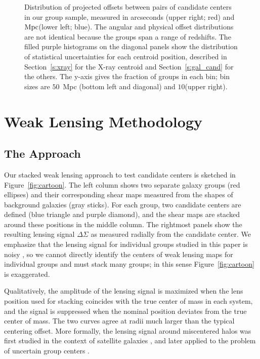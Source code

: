 \documentclass[12pt]{emulateapj}
\begin{document}
\begin{figure*}[htb]
\caption{Distribution of projected offsets between pairs of candidate
  centers in our group sample, measured in arcseconds (upper right;
  red) and ${\rm Mpc} $(lower left; blue). The angular and physical
  offset distributions are not identical because the groups span a
  range of redshifts. The filled purple histograms on the diagonal
  panels show the distribution of statistical uncertainties for each
  centroid position, described in Section~\ref{s:xray} for the X-ray
  centroid and Section~\ref{s:gal_cand} for the others. The y-axis
  gives the fraction of groups in each bin; 
  bin sizes are $50$~\rm{Mpc} (bottom left and diagonal) and
  $10$\arcsec (upper right).}
\label{fig:offsets}
\end{figure*}



\section{Weak Lensing Methodology}
\label{s:lensing}

\subsection{The Approach}

Our stacked weak lensing approach to test candidate centers is
sketched in Figure~\ref{fig:cartoon}. The left column shows two
separate galaxy groups (red ellipses) and their corresponding shear
maps measured from the shapes of background galaxies (gray
sticks). For each group, two candidate centers are defined (blue
triangle and purple diamond), and the shear maps are stacked around
these positions in the middle column. The rightmost panels show the
resulting lensing signal $\Delta\Sigma$ as measured radially from the
candidate center. We emphasize that the lensing signal for individual
groups studied in this paper is noisy \citep[signal-to-noise $\sim1$;
see Figure 1 of ][]{Leauthaud2010}, so we cannot directly identify the
centers of weak lensing maps for individual groups and must stack many
groups; in this sense Figure~\ref{fig:cartoon} is exaggerated.

Qualitatively, the amplitude of the lensing signal is maximized when
the lens position used for stacking coincides with the true center of
mass in each system, and the signal is suppressed when the nominal
position deviates from the true center of mass. The two curves agree
at radii much larger than the typical centering offset.  More
formally, the lensing signal around miscentered halos was first
studied in the context of satellite galaxies \citep{Natarajan1997,
  Hudson1998, Guzik2002, Yang2003, Yang2006}, and later applied to the
problem of uncertain group centers \citep{Johnston2007a,
  Johnston2007b}.
\end{document}
